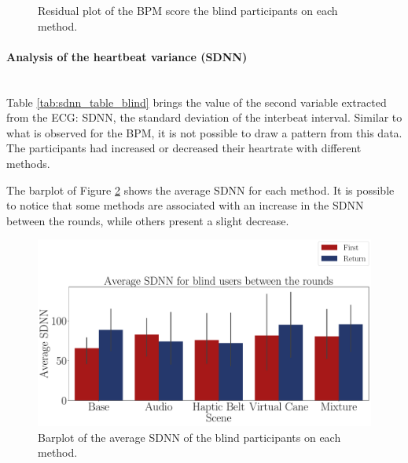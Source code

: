 \begin{figure}[!htb]
\begin{minipage}{0.45\textwidth}
        \caption{Residual plot of the BPM score the blind participants on each method.}
        \label{fig:residplot_bpm_two_way_blind}
    \end{minipage}
\end{figure}



%


\FloatBarrier

%
%
\paragraph{Analysis of the heartbeat variance (SDNN)}\mbox{}\\
%
Table \ref{tab:sdnn_table_blind} brings the value of the second variable extracted from the ECG: SDNN, the standard deviation of the interbeat interval. Similar to what is observed for the BPM, it is not possible to draw a pattern from this data. The participants had increased or decreased their heartrate with different methods.



The barplot of Figure \ref{fig:barplot_ecg_sdnn_5_scene_blind} shows the average SDNN for each method. It is possible to notice that some methods are associated with an increase in the SDNN between the rounds, while others present a slight decrease.

\begin{figure}[!htb]
    \centering
    \includegraphics[width = \textwidth]{Resultados/ECG/Figuras/pdf/barplot_ecg_sdnn_5_scene_blind.pdf}
    \caption{Barplot of the average SDNN of the blind participants on each method.}
    \label{fig:barplot_ecg_sdnn_5_scene_blind}
\end{figure}

